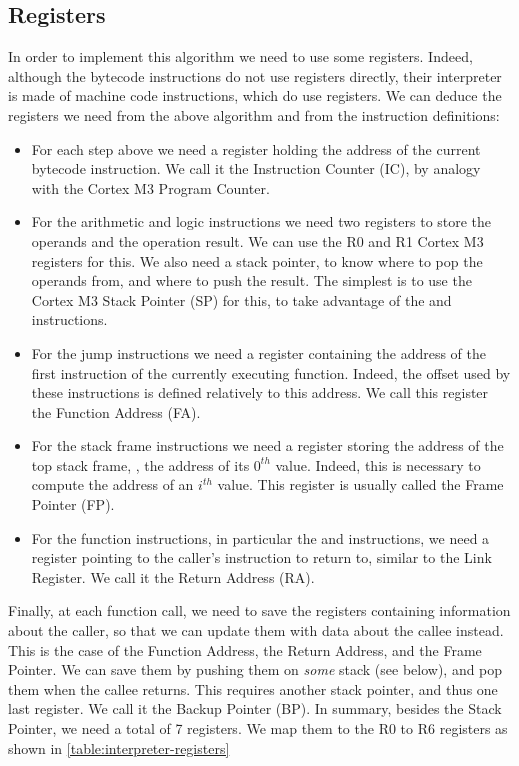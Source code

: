\subsection{Registers}

In order to implement this algorithm we need to use some registers. Indeed,
although the bytecode instructions do not use registers directly, their
interpreter is made of machine code instructions, which do use registers. We
can deduce the registers we need from the above algorithm and from the
instruction definitions:
\begin{itemize}
  \item For each step above we need a register holding the address of the
  current bytecode instruction. We call it the Instruction Counter (IC), by
  analogy with the Cortex M3 Program Counter.

  \item For the arithmetic and logic instructions we need two registers to
  store the operands and the operation result. We can use the R0 and R1 Cortex
  M3 registers for this. We also need a stack pointer, to know where to pop the
  operands from, and where to push the result. The simplest is to use the
  Cortex M3 Stack Pointer (SP) for this, to take advantage of the 
  and  instructions.

  \item For the jump instructions we need a register containing the address of
  the first instruction of the currently executing function. Indeed, the
  offset used by these instructions is defined relatively to this address. We
  call this register the Function Address (FA).

  \item For the stack frame instructions we need a register storing the address
  of the top stack frame, \ie, the address of its $0^{th}$ value. Indeed, this
  is necessary to compute the address of an $i^{th}$ value. This register is
  usually called the Frame Pointer (FP).

  \item For the function instructions, in particular the  and
   instructions, we need a register pointing to the caller's
  instruction to return to, similar to the Link Register. We call it the Return
  Address (RA).
\end{itemize}

Finally, at each function call, we need to save the registers containing
information about the caller, so that we can update them with data about the
callee instead. This is the case of the Function Address, the Return Address,
and the Frame Pointer. We can save them by pushing them on {\em some} stack
(see below), and pop them when the callee returns. This requires another stack
pointer, and thus one last register. We call it the Backup Pointer (BP). In
summary, besides the Stack Pointer, we need a total of 7 registers. We map them
to the R0 to R6 registers as shown in \cref{table:interpreter-registers}

